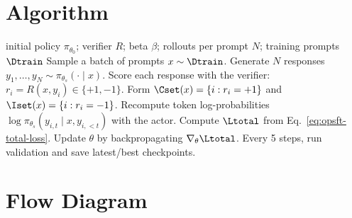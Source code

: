 \section{Algorithm}
\label{sec:opsft-algorithm}

\begin{algorithm}[t]
\caption{Stage-1 On-Policy SFT with reverse-SFT beta}
\label{alg:opsft-on-policy-sft}
\begin{algorithmic}[1]
\Require initial policy $\pi_{\theta_0}$; verifier $R$; beta $\beta$; rollouts per prompt $N$; training prompts $\Dtrain$
    \State Sample a batch of prompts $x\sim\Dtrain$.
        \State Generate $N$ responses $y_1,\ldots,y_N\sim \pi_{\theta_s}(\cdot\mid x)$.
        \State Score each response with the verifier: $r_i=R(x,y_i)\in\{+1,-1\}$.
        \State Form $\Cset(x)=\{i:r_i=+1\}$ and $\Iset(x)=\{i:r_i=-1\}$.
    \EndFor
    \State Recompute token log-probabilities $\log \pi_{\theta_s}(y_{i,t}\mid x,y_{i,<t})$ with the actor.
    \State Compute $\Ltotal$ from Eq.~\eqref{eq:opsft-total-loss}.
    \State Update $\theta$ by backpropagating $\nabla_{\theta}\Ltotal$.
    \State Every 5 steps, run validation and save latest/best checkpoints.
\EndFor
\end{algorithmic}
\end{algorithm}

\section{Flow Diagram}
\label{sec:opsft-flow}

